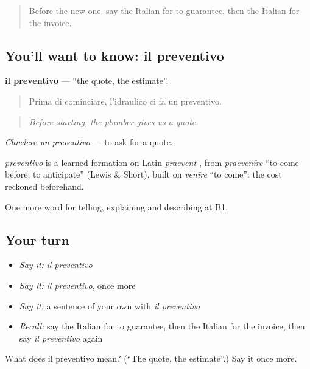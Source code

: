 \begin{quote}
Before the new one: say the Italian for to guarantee, then the Italian for the invoice.
\end{quote}

\subsection*{You'll want to know: il preventivo}
\textbf{il preventivo} — \textquotedblleft{}the quote, the estimate\textquotedblright{}.

\begin{quote}
Prima di cominciare, l'idraulico ci fa un preventivo.
\end{quote}

\begin{quote}
\emph{Before starting, the plumber gives us a quote.}
\end{quote}

\emph{Chiedere un preventivo} — to ask for a quote.

\begin{cousinweb}
\emph{preventivo} is a learned formation on Latin \emph{praevent-}, from \emph{praevenīre} \textquotedblleft{}to come before, to anticipate\textquotedblright{} (Lewis \& Short), built on \emph{venīre} \textquotedblleft{}to come\textquotedblright{}: the cost reckoned beforehand.
\end{cousinweb}

\begin{grammarlens}[title={What you've built}]
One more word for telling, explaining and describing at B1.
\end{grammarlens}

\subsection*{Your turn}
\begin{itemize}
\raggedright
  \item \emph{Say it:} \emph{il preventivo}
  \item \emph{Say it:} \emph{il preventivo}, once more
  \item \emph{Say it:} a sentence of your own with \emph{il preventivo}
  \item \emph{Recall:} say the Italian for to guarantee, then the Italian for the invoice, then say \emph{il preventivo} again
\end{itemize}

\begin{tcolorbox}[breakable,colback=teal!4,colframe=teal!35!black,title={Before you move on}]
What does il preventivo mean? (\textquotedblleft{}The quote, the estimate\textquotedblright{}.) Say it once more.
\end{tcolorbox}
